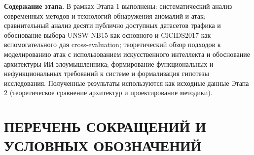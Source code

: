 \documentclass[14pt, a4paper]{extarticle}
\begin{document}
\textbf{Содержание этапа.} В рамках Этапа 1 выполнены: систематический
анализ современных методов и технологий обнаружения аномалий и атак;
сравнительный анализ десяти публично доступных датасетов трафика и
обоснование выбора UNSW-NB15 как основного и CICIDS2017 как
вспомогательного для cross-evaluation; теоретический обзор подходов к
моделированию атак с использованием искусственного интеллекта и
обоснование архитектуры ИИ-злоумышленника; формирование функциональных
и нефункциональных требований к системе и формализация гипотезы
исследования. Полученные результаты используются как исходные данные
Этапа 2 (теоретическое сравнение архитектур и проектирование методики).

\newpage

\section*{ПЕРЕЧЕНЬ СОКРАЩЕНИЙ И УСЛОВНЫХ ОБОЗНАЧЕНИЙ}
\end{document}
